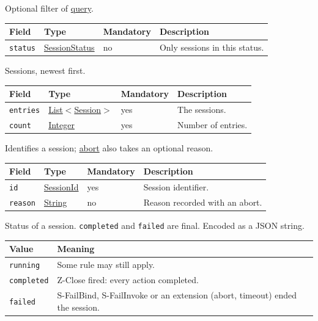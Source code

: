 \documentclass[a4paper]{arrowhead}
\newcommand{\mref}[1]{{\textcolor{ArrowheadPurple}{\hyperref[sec:model:#1]{#1}}}}
\newcommand{\oref}[1]{{\textcolor{ArrowheadBlue}{\hyperref[sec:operations:#1]{#1}}}}
\newcommand{\pref}[1]{{\textcolor{ArrowheadGrey}{\hyperref[sec:model:primitives:#1]{#1}}}}
\begin{document}
Optional filter of \oref{query}.

{\small
\begin{longtable}{|p{3.7cm}|p{4.2cm}|p{1.6cm}|p{6.3cm}|}

\hline
\rowcolor{gray!33} Field & Type & Mandatory & Description \\ \hline
\endhead
\texttt{status} & \mref{SessionStatus} & no & Only sessions in this status. \\ \hline
\end{longtable}
}

Sessions, newest first.

{\small
\begin{longtable}{|p{3.7cm}|p{4.2cm}|p{1.6cm}|p{6.3cm}|}

\hline
\rowcolor{gray!33} Field & Type & Mandatory & Description \\ \hline
\endhead
\texttt{entries} & \pref{List}$<$\mref{Session}$>$ & yes & The sessions. \\ \hline
\texttt{count} & \pref{Integer} & yes & Number of entries. \\ \hline
\end{longtable}
}

Identifies a session; \oref{abort} also takes an optional reason.

{\small
\begin{longtable}{|p{3.7cm}|p{4.2cm}|p{1.6cm}|p{6.3cm}|}

\hline
\rowcolor{gray!33} Field & Type & Mandatory & Description \\ \hline
\endhead
\texttt{id} & \pref{SessionId} & yes & Session identifier. \\ \hline
\texttt{reason} & \pref{String} & no & Reason recorded with an abort. \\ \hline
\end{longtable}
}

Status of a session. \texttt{completed} and \texttt{failed} are final.
 Encoded as a JSON string.
{\small
\begin{longtable}{|p{3.9cm}|p{11.9cm}|}

\hline
\rowcolor{gray!33} Value & Meaning \\ \hline
\endhead
\texttt{running} & Some rule may still apply. \\ \hline
\texttt{completed} & Z-Close fired: every action completed. \\ \hline
\texttt{failed} & S-FailBind, S-FailInvoke or an extension (abort, timeout) ended the session. \\ \hline
\end{longtable}
}
\end{document}
